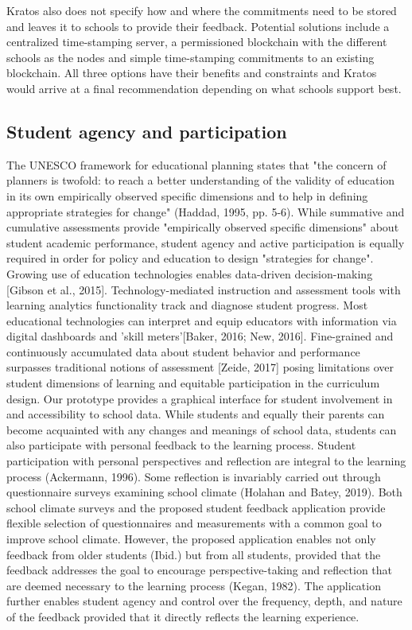 \documentclass{article}
\begin{document}
\bigbreak
Kratos also does not specify how and where the commitments need to be stored and leaves it to schools to provide their feedback. Potential solutions include a centralized time-stamping server, a permissioned blockchain with the different schools as the nodes and simple time-stamping commitments to an existing blockchain. All three options have their benefits and constraints and Kratos would arrive at a final recommendation depending on what schools support best.
\bigbreak

\subsection{Student agency and participation}
The UNESCO framework for educational planning states that "the concern of planners is twofold: to reach a better understanding of the validity of education in its own empirically observed specific dimensions and to help in defining appropriate strategies for change" (Haddad, 1995, pp. 5-6).
\bigbreak
While summative and cumulative assessments provide "empirically observed specific dimensions" about student academic performance, student agency and active participation is equally required in order for policy and education to design "strategies for change". Growing use of education technologies enables data-driven decision-making [Gibson et al., 2015]. Technology-mediated instruction and assessment tools with learning analytics functionality track and diagnose student progress. Most educational technologies can interpret and equip educators with information via digital dashboards and 'skill meters'[Baker, 2016; New, 2016]. Fine-grained and continuously accumulated data about student behavior and performance surpasses traditional notions of assessment [Zeide, 2017] posing limitations over student dimensions of learning and equitable participation in the curriculum design.
\bigbreak
Our prototype provides a graphical interface for student involvement in and accessibility to school data. While students and equally their parents can become acquainted with any changes and meanings of school data, students can also participate with personal feedback to the learning process. Student participation with personal perspectives and reflection are integral to the learning process (Ackermann, 1996). Some reflection is invariably carried out through questionnaire surveys examining school climate (Holahan and Batey, 2019). Both school climate surveys and the proposed student feedback application provide flexible selection of questionnaires and measurements with a common goal to improve school climate. However, the proposed application enables not only feedback from older students (Ibid.) but from all students, provided that the feedback addresses the goal to encourage perspective-taking and reflection that are deemed necessary to the learning process (Kegan, 1982). The application further enables student agency and control over the frequency, depth, and nature of the feedback provided that it directly reflects the learning experience.
\end{document}
